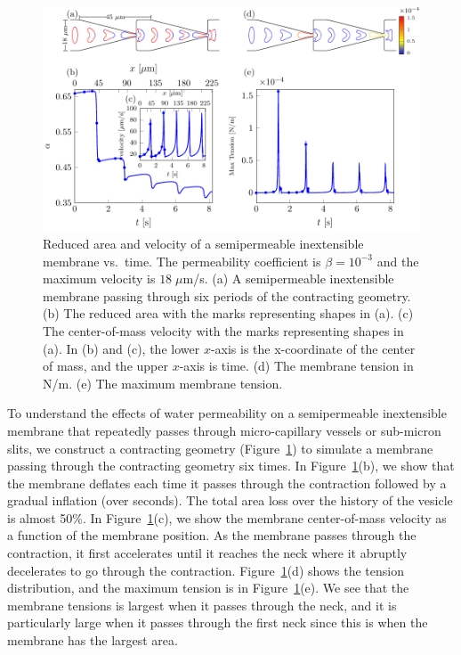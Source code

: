 \documentclass[prb,preprint,showpacs,preprintnumbers,amsmath,amssymb,longbibliography]{revtex4-1}
\newif\ifTikz
\begin{document}
\begin{figure}[hbp]
  \centering
  \ifTikz
  
  \else
  \includegraphics{figures/contractingComposite2.pdf}
  \fi
  \caption{\label{fig:contractingComposite2} Reduced area and
  velocity of a semipermeable inextensible membrane vs.~time. The permeability coefficient is $\beta = 10^{-3}$
  and the maximum velocity is $18\;\mu$m/s. (a) A semipermeable inextensible membrane
  passing through six periods of the contracting geometry. (b) The
  reduced area with the marks representing shapes in (a). (c) The
  center-of-mass velocity with the marks representing shapes in (a). In (b) and
  (c), the lower $x$-axis is the x-coordinate of the center of mass, and
  the upper $x$-axis is time. (d) The membrane tension in N/m. (e) The
  maximum membrane tension.}
\end{figure}
To understand the effects of water permeability on a semipermeable inextensible membrane that
repeatedly passes through micro-capillary vessels or sub-micron slits,
we construct a contracting geometry
(Figure~\ref{fig:contractingComposite2}) to simulate a membrane passing
through the contracting geometry six times. In
Figure~\ref{fig:contractingComposite2}(b), we show that the membrane
deflates each time it passes through the contraction followed by a
gradual inflation (over seconds). The total area loss over the history
of the vesicle is almost 50\%. In
Figure~\ref{fig:contractingComposite2}(c), we show the membrane center-of-mass velocity
as a function of the membrane position. As the membrane passes
through the contraction, it first accelerates until it reaches the neck
where it abruptly decelerates to go through the contraction.
Figure~\ref{fig:contractingComposite2}(d) shows the tension
distribution, and the maximum tension is in
Figure~\ref{fig:contractingComposite2}(e). We see that the membrane
tensions is largest when it passes through the neck, and it is
particularly large when it passes through the first neck since this is
when the membrane has the largest area.
\end{document}
